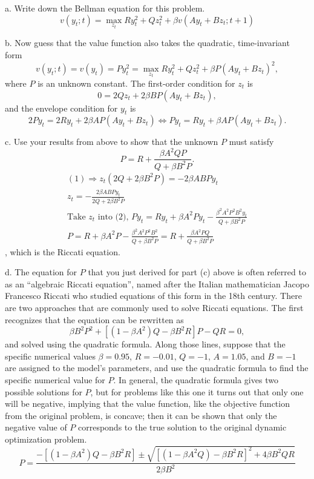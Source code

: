 \documentclass[12pt]{article}
\begin{document}
\begin{description}
\item a. Write down the Bellman equation for this problem.
$$
v(y_t;t) = \max_{z_t}Ry_t^2 + Qz_t^2 + \beta v(Ay_t+ Bz_t;t+1)
$$
\item b. Now guess that the value function also takes the quadratic, time-invariant form
$$
v(y_{t};t) = v(y_{t}) = Py_{t}^{2} = \max_{z_t}Ry_t^2 + Qz_t^2 + \beta P(Ay_t + Bz_t)^2 ,
$$
where $P$ is an unknown constant. The first-order condition for $z_{t}$ is 
\begin{equation}
0 = 2Qz_t + 2\beta BP(Ay_t + Bz_t), 
\end{equation}
and the envelope condition for $y_{t}$ is 
\begin{equation}
2Py_t = 2Ry_t + 2\beta AP(Ay_t + Bz_t) \iff Py_t = Ry_t + \beta AP(Ay_t + Bz_t). 
\end{equation}
\item c. Use your results from above to show that the unknown $P$ must satisfy
$$
P = R + \frac{\beta A^{2}QP}{Q+\beta B^{2} P}.
$$
\begin{gather*}
(1) \Rightarrow z_t(2Q + 2\beta B^2P) = -2\beta ABPy_t    \\ 
z_t = -\frac{2\beta ABPy_t}{2Q + 2\beta B^2P} \\ 
\text{Take $z_t$ into (2), } Py_t = Ry_t + \beta A^2Py_t - \frac{\beta^2A^2P^2B^2y_t}{Q + \beta B^2P} \\ 
P = R + \beta A^2P - \frac{\beta^2A^2P^2B^2}{Q + \beta B^2P} = R + \frac{\beta A^2PQ}{Q+\beta B^2P}
\end{gather*}, which is the Riccati equation. 
\item d. The equation for $P$ that you just derived for part (c) above is often referred to as an ``algebraic Riccati equation'', named after the Italian mathematician Jacopo Francesco Riccati who studied equations of this form in the 18th century. There are two approaches that are commonly used to solve Riccati equations. The first recognizes that the equation can be rewritten as
$$
\beta B^{2} P^{2} + [(1-\beta A^{2})Q-\beta B^{2}R]P - QR = 0,
$$
and solved using the quadratic formula. Along those lines, suppose that the specific numerical values $\beta=0.95$, $R=-0.01$, $Q=-1$, $A=1.05$, and $B=-1$ are assigned to the model's parameters, and use the quadratic formula to find the specific numerical value for $P$. In general, the quadratic formula gives two possible solutions for $P$, but for problems like this one it turns out that only one will be negative, implying that the value function, like the objective function from the original problem, is concave; then it can be shown that only the negative value of $P$ corresponds to the true solution to the original dynamic optimization problem.
$$
P = \frac{-[(1-\beta A^2)Q - \beta B^2R] \pm \sqrt{[(1-\beta A^2Q) - \beta B^2R]^2 + 4\beta B^2QR}}{2\beta B^2}
$$
\end{description}
\end{document}

